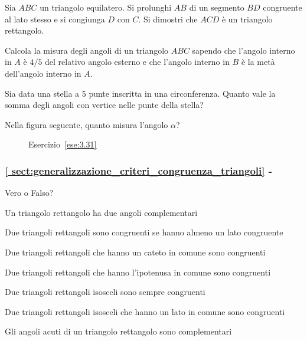 \begin{esercizio}
\label{ese:3.48}
Sia $ABC$ un triangolo equilatero. Si prolunghi $AB$ di un segmento 
$BD$ congruente al lato stesso e si congiunga $D$ con $C$. Si 
dimostri che $ACD$ è un triangolo rettangolo.
\end{esercizio}

\begin{esercizio}
\label{ese:3.49}
Calcola la misura degli angoli di un triangolo $ABC$ sapendo che 
l'angolo interno in $A$ è $4/5$ del relativo angolo esterno e che 
l'angolo interno in $B$ è la metà dell'angolo interno in $A$.
\end{esercizio}

\begin{esercizio}
\label{ese:3.50}
Sia data una stella a 5 punte inscritta in una circonferenza. Quanto 
vale la somma degli angoli con vertice nelle punte della stella? 
\end{esercizio}

\begin{esercizio}
\label{ese:3.51}
Nella figura seguente, quanto misura l'angolo $\alpha$?  
\end{esercizio}

\begin{inaccessibleblock}
 \begin{figure}[htb]
\centering
\caption{Esercizio~\ref{ese:3.31}}\label{fig:ese3.51}
\end{figure}
\end{inaccessibleblock}

\begingroup
\hypersetup{linkcolor=black}
\subsubsection*{\ref{
sect:generalizzazione_criteri_congruenza_triangoli} - 
}
\endgroup

\begin{esercizio}
\label{ese:3.52}
Vero o Falso?
\begin{enumeratea}
\item Un triangolo rettangolo ha due angoli 
complementari\hfill\boxV\quad\boxF
\item Due triangoli rettangoli sono congruenti se hanno almeno un 
lato congruente\hfill\boxV\quad\boxF
\item Due triangoli rettangoli che hanno un cateto in comune sono 
congruenti\hfill\boxV\quad\boxF
\item Due triangoli rettangoli che hanno l'ipotenusa in comune sono 
congruenti\hfill\boxV\quad\boxF
\item Due triangoli rettangoli isosceli sono sempre 
congruenti\hfill\boxV\quad\boxF
\item Due triangoli rettangoli isosceli che hanno un lato in comune 
sono congruenti\hfill\boxV\quad\boxF
\item Gli angoli acuti di un triangolo rettangolo sono 
complementari\hfill\boxV\quad\boxF
\end{enumeratea}
\end{esercizio}

